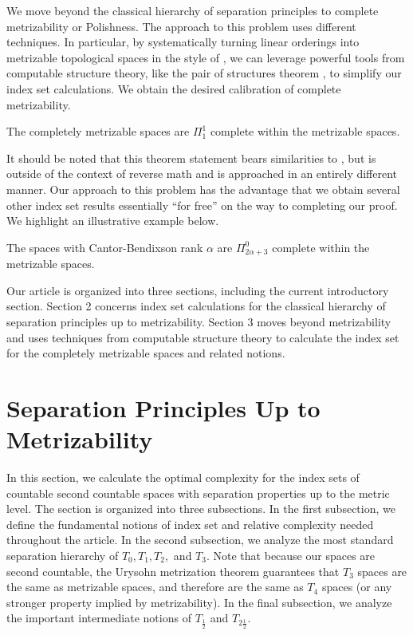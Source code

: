\documentclass[11pt]{amsart}
\theoremstyle{remark}
\begin{document}
We move beyond the classical hierarchy of separation principles to complete metrizability or Polishness.
The approach to this problem uses different techniques.
In particular, by systematically turning linear orderings into metrizable topological spaces in the style of \cite{S20,G24}, we can leverage powerful tools from computable structure theory, like the pair of structures theorem \cite{AK90}, to simplify our index set calculations.
We obtain the desired calibration of complete metrizability.
\begin{theorem}
    The completely metrizable spaces are $\Pi_1^1$ complete within the metrizable spaces.
\end{theorem}
\noindent It should be noted that this theorem statement bears similarities to \cite[Corollary 12.10]{G24}, but is outside of the context of reverse math and is approached in an entirely different manner.
Our approach to this problem has the advantage that we obtain several other index set results essentially ``for free'' on the way to completing our proof.
We highlight an illustrative example below.
\begin{proposition}
    The spaces with Cantor-Bendixson rank $\alpha$ are $\Pi_{2\alpha+3}^0$ complete within the metrizable spaces.
\end{proposition}

Our article is organized into three sections, including the current introductory section.
Section 2 concerns index set calculations for the classical hierarchy of separation principles up to metrizability.
Section 3 moves beyond metrizability and uses techniques from computable structure theory to calculate the index set for the completely metrizable spaces and related notions.

\section{Separation Principles Up to Metrizability}
In this section, we calculate the optimal complexity for the index sets of countable second countable spaces with separation properties up to the metric level.
The section is organized into three subsections.
In the first subsection, we define the fundamental notions of index set and relative complexity needed throughout the article.
In the second subsection, we analyze the most standard separation hierarchy of $T_0,T_1,T_2,$ and $T_3$.
Note that because our spaces are second countable, the Urysohn metrization theorem guarantees that $T_3$ spaces are the same as metrizable spaces, and therefore are the same as $T_4$ spaces (or any stronger property implied by metrizability).
In the final subsection, we analyze the important intermediate notions of $T_{\frac12}$ and $T_{2 \frac12}$.
\end{document}
